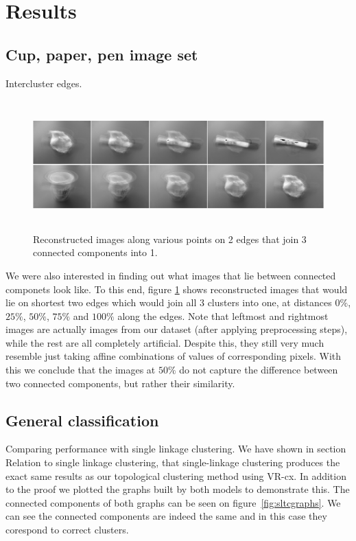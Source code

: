 \documentclass{article}
\newcommand{\enterProblemHeader}[1]{
}
\newcommand{\exitProblemHeader}[1]{
}
\newcounter{homeworkProblemCounter} %
\newcommand{\homeworkProblemName}{}
\newenvironment{homeworkProblem}[1][Problem \arabic{homeworkProblemCounter}]{ %
\stepcounter{homeworkProblemCounter} %
\renewcommand{\homeworkProblemName}{#1} %
\section{\homeworkProblemName} %
\enterProblemHeader{\homeworkProblemName} %
}{
\exitProblemHeader{\homeworkProblemName} %
}
\newcommand{\homeworkSectionName}{}
\newenvironment{homeworkSection}[1]{ %
\renewcommand{\homeworkSectionName}{#1} %
\subsection{\homeworkSectionName} %
\enterProblemHeader{\homeworkProblemName\ [\homeworkSectionName]} %
}{
\enterProblemHeader{\homeworkProblemName} %
}
\begin{document}
\begin{homeworkProblem}[Results]
\begin{homeworkSection}{Cup, paper, pen image set}
\begin{paragraph}{Intercluster edges.}
\begin{figure}[h]
    \centering
    \includegraphics[height=5cm]{img/edges}
    \caption{Reconstructed images along various points on 2 edges that join 3 connected components into 1.}
    \label{fig:edges}
\end{figure}
We were also interested in finding out what images that lie between connected componets look like. To this end, figure \ref{fig:edges} shows reconstructed images that would lie on shortest two edges which would join all 3 clusters into one, at distances $0\%$, $25\%$, $50\%$, $75\%$ and $100\%$ along the edges. Note that leftmost and rightmost images are actually images from our dataset (after applying preprocessing steps), while the rest are all completely artificial. Despite this, they still very much resemble just taking affine combinations of values of corresponding pixels. With this we conclude that the images at $50\%$ do not capture the difference between two connected components, but rather their similarity.

\end{paragraph}

\end{homeworkSection}


\begin{homeworkSection}{General classification}
  
\begin{paragraph}{Comparing performance with single linkage clustering.}
We have shown in section Relation to single linkage clustering, that single-linkage clustering produces the exact same results as our topological clustering method using VR-cx. In addition to the proof we plotted the graphs built by both models to demonstrate this. The connected components of both graphs can be seen on figure~\ref{fig:sltcgraphs}. We can see the connected components are indeed the same and in this case they corespond to correct clusters.


\end{paragraph}
\end{homeworkSection}
\end{homeworkProblem}
\end{document}
